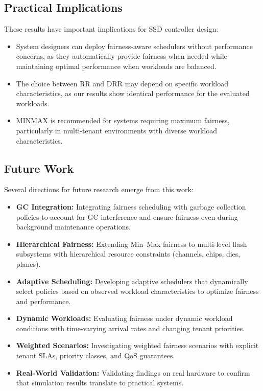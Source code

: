 \documentclass[11pt]{article}
\begin{document}
\subsection{Practical Implications}

These results have important implications for SSD controller design:
\begin{itemize}
    \item System designers can deploy fairness-aware schedulers without performance concerns, as they automatically provide fairness when needed while maintaining optimal performance when workloads are balanced.
    \item The choice between RR and DRR may depend on specific workload characteristics, as our results show identical performance for the evaluated workloads.
    \item MINMAX is recommended for systems requiring maximum fairness, particularly in multi-tenant environments with diverse workload characteristics.
\end{itemize}

\subsection{Future Work}

Several directions for future research emerge from this work:
\begin{itemize}
    \item \textbf{GC Integration:} Integrating fairness scheduling with garbage collection policies to account for GC interference and ensure fairness even during background maintenance operations.
    \item \textbf{Hierarchical Fairness:} Extending Min--Max fairness to multi-level flash subsystems with hierarchical resource constraints (channels, chips, dies, planes).
    \item \textbf{Adaptive Scheduling:} Developing adaptive schedulers that dynamically select policies based on observed workload characteristics to optimize fairness and performance.
    \item \textbf{Dynamic Workloads:} Evaluating fairness under dynamic workload conditions with time-varying arrival rates and changing tenant priorities.
    \item \textbf{Weighted Scenarios:} Investigating weighted fairness scenarios with explicit tenant SLAs, priority classes, and QoS guarantees.
    \item \textbf{Real-World Validation:} Validating findings on real hardware to confirm that simulation results translate to practical systems.
\end{itemize}
\end{document}
